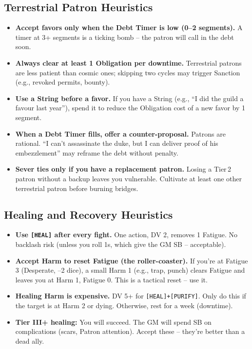 \documentclass[11pt]{article}
\begin{document}
\subsection*{Terrestrial Patron Heuristics}
\begin{itemize}
  \item \textbf{Accept favors only when the Debt Timer is low (0–2 segments).} A timer at 3+ segments is a ticking bomb – the patron will call in the debt soon.
  \item \textbf{Always clear at least 1 Obligation per downtime.} Terrestrial patrons are less patient than cosmic ones; skipping two cycles may trigger Sanction (e.g., revoked permits, bounty).
  \item \textbf{Use a String before a favor.} If you have a String (e.g., “I did the guild a favour last year”), spend it to reduce the Obligation cost of a new favor by 1 segment.
  \item \textbf{When a Debt Timer fills, offer a counter-proposal.} Patrons are rational. “I can’t assassinate the duke, but I can deliver proof of his embezzlement” may reframe the debt without penalty.
  \item \textbf{Sever ties only if you have a replacement patron.} Losing a Tier 2 patron without a backup leaves you vulnerable. Cultivate at least one other terrestrial patron before burning bridges.
\end{itemize}

\subsection*{Healing and Recovery Heuristics}

\begin{itemize}
    \item \textbf{Use \texttt{[HEAL]} after every fight.} One action, DV 2, removes 1 Fatigue. No backlash risk (unless you roll 1s, which give the GM SB – acceptable).
    \item \textbf{Accept Harm to reset Fatigue (the roller-coaster).} If you're at Fatigue 3 (Desperate, –2 dice), a small Harm 1 (e.g., trap, punch) clears Fatigue and leaves you at Harm 1, Fatigue 0. This is a tactical reset – use it.
    \item \textbf{Healing Harm is expensive.} DV 5+ for \texttt{[HEAL]+[PURIFY]}. Only do this if the target is at Harm 2 or dying. Otherwise, rest for a week (downtime).
    \item \textbf{Tier III+ healing:} You will succeed. The GM will spend SB on complications (scars, Patron attention). Accept these – they're better than a dead ally.
\end{itemize}
\end{document}
